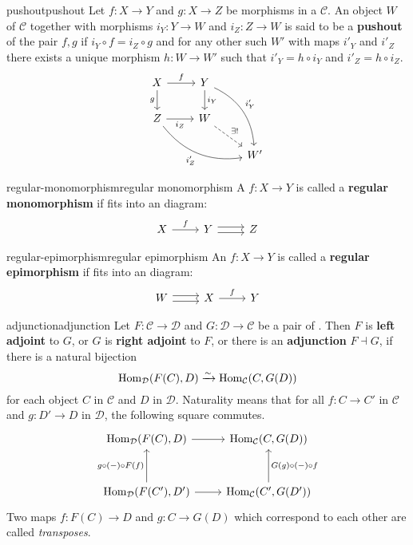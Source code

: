 \begin{topic}{pushout}{pushout}
    Let $f \colon X \to Y$ and $g \colon X \to Z$ be morphisms in a  $\mathcal{C}$. An object $W$ of $\mathcal{C}$ together with morphisms $i_Y: Y \to W$ and $i_Z \colon Z \to W$ is said to be a \textbf{pushout} of the pair $f, g$ if $i_Y \circ f = i_Z \circ g$ and for any other such $W'$ with maps $i'_Y$ and $i'_Z$ there exists a unique morphism $h \colon W \to W'$ such that $i'_Y = h \circ i_Y$ and $i'_Z = h \circ i_Z$.
    \[ \svg \begin{tikzcd} X \arrow{r}{f} \arrow[swap]{d}{g} & Y \arrow{d}{i_Y} \arrow[bend left=30]{rdd}{i'_Y} & \\ Z \arrow[swap]{r}{i_Z} \arrow[swap, bend right=30]{drr}{i'_Z} & W \arrow[dashed]{rd}{\exists!} & \\ & & W' \end{tikzcd} \]
\end{topic}

\begin{topic}{regular-monomorphism}{regular monomorphism}
    A  $f \colon X \to Y$ is called a \textbf{regular monomorphism} if fits into an  diagram:
    \[ \svg \begin{tikzcd} X \arrow{r}{f} & Y \arrow[shift left=0.25em]{r} \arrow[shift right=0.25em]{r} & Z \end{tikzcd} \]
\end{topic}

\begin{topic}{regular-epimorphism}{regular epimorphism}
    An  $f \colon X \to Y$ is called a \textbf{regular epimorphism} if fits into an  diagram:
    \[ \svg \begin{tikzcd} W \arrow[shift left=0.25em]{r} \arrow[shift right=0.25em]{r} & X \arrow{r}{f} & Y \end{tikzcd} \]
\end{topic}

\begin{topic}{adjunction}{adjunction}
    Let $F \colon \mathcal{C} \to \mathcal{D}$ and $G \colon \mathcal{D} \to \mathcal{C}$ be a pair of . Then $F$ is \textbf{left adjoint} to $G$, or $G$ is \textbf{right adjoint} to $F$, or there is an \textbf{adjunction} $F \dashv G$, if there is a natural bijection
    \[ \operatorname{Hom}_{\mathcal{D}}(F(C), D) \xrightarrow{\sim} \operatorname{Hom}_{\mathcal{C}}(C, G(D)) \]
    for each object $C$ in $\mathcal{C}$ and $D$ in $\mathcal{D}$. Naturality means that for all $f \colon C \to C'$ in $\mathcal{C}$ and $g \colon D' \to D$ in $\mathcal{D}$, the following square commutes.
    \[ \svg \begin{tikzcd}[row sep=3em] \Hom_{\mathcal{D}}(F(C), D) \arrow{r} & \Hom_{\mathcal{C}}(C, G(D)) \\ \Hom_{\mathcal{D}}(F(C'), D') \arrow{r} \arrow{u}{g \circ (-) \circ F(f)} & \Hom_{\mathcal{C}}(C', G(D')) \arrow[swap]{u}{G(g) \circ (-) \circ f} \end{tikzcd} \]
    Two maps $f \colon F(C) \to D$ and $g \colon C \to G(D)$ which correspond to each other are called \textit{transposes}.
\end{topic}

